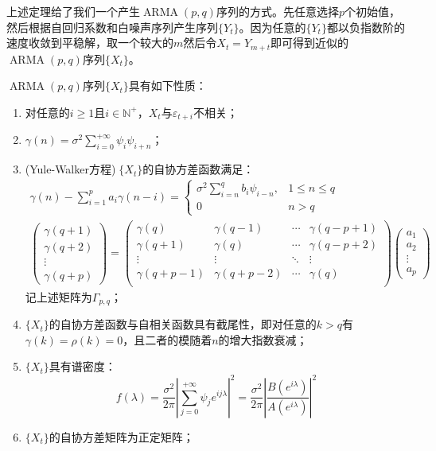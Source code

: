 \begin{note}
	上述定理给了我们一个产生$\operatorname{ARMA}(p,q)$序列的方式。先任意选择$p$个初始值，然后根据自回归系数和白噪声序列产生序列$\{Y_t\}$。因为任意的$\{Y_t\}$都以负指数阶的速度收敛到平稳解，取一个较大的$m$然后令$X_t=Y_{m+t}$即可得到近似的$\operatorname{ARMA}(p,q)$序列$\{X_t\}$。
\end{note}
\begin{property}
	$\operatorname{ARMA}(p,q)$序列$\{X_t\}$具有如下性质：
	\begin{enumerate}
		\item 对任意的$i\geqslant1$且$i\in\mathbb{N}^+$，$X_t$与$\varepsilon_{t+i}$不相关；
		\item $\gamma(n)=\sigma^2\sum\limits_{i=0}^{+\infty}\psi_i\psi_{i+n}$；
		\item (Yule-Walker方程)$\;\{X_t\}$的自协方差函数满足：
		\begin{gather*}
			\gamma(n)-\sum_{i=1}^{p}a_i\gamma(n-i)=
			\begin{cases}
				\sigma^2\sum\limits_{i=n}^{q}b_i\psi_{i-n},&1\leqslant n\leqslant q \\
				0 & n>q
			\end{cases} \\
			\begin{pmatrix}
				\gamma(q+1) \\
				\gamma(q+2) \\
				\vdots \\
				\gamma(q+p)
			\end{pmatrix}=
			\begin{pmatrix}
				\gamma(q) & \gamma(q-1) & \cdots & \gamma(q-p+1) \\
				\gamma(q+1) & \gamma(q) & \cdots & \gamma(q-p+2) \\
				\vdots & \vdots & \ddots & \vdots \\
				\gamma(q+p-1) & \gamma(q+p-2) & \cdots & \gamma(q) \\
			\end{pmatrix}
			\begin{pmatrix}
				a_1 \\
				a_2 \\
				\vdots \\
				a_p
			\end{pmatrix}
		\end{gather*}
		记上述矩阵为$\Gamma_{p,q}$；
		\item $\{X_t\}$的自协方差函数与自相关函数具有截尾性，即对任意的$k>q$有$\gamma(k)=\rho(k)=0$，且二者的模随着$n$的增大指数衰减；
		\item $\{X_t\}$具有谱密度：
		\begin{equation*}
			f(\lambda)=\frac{\sigma^2}{2\pi}\left|\sum_{j=0}^{+\infty}\psi_je^{ij\lambda}\right|^2=\frac{\sigma^2}{2\pi}\left|\frac{B(e^{i\lambda})}{A(e^{i\lambda})}\right|^2
		\end{equation*}
		\item $\{X_t\}$的自协方差矩阵为正定矩阵；
	\end{enumerate}
\end{property}
